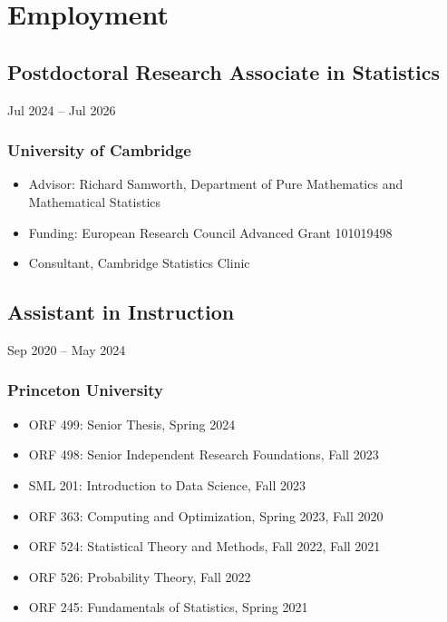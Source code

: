 \documentclass{wgu-cv}
\begin{document}
\maketitle

\section{Employment}

\subsection{Postdoctoral Research Associate in Statistics}
{Jul 2024 -- Jul 2026}
\subsubsection{University of Cambridge}

\begin{itemize}
  \item Advisor: Richard Samworth,
    Department of Pure Mathematics and Mathematical Statistics
  \item Funding: European Research Council Advanced Grant 101019498
  \item Consultant, Cambridge Statistics Clinic
\end{itemize}

\subsection{Assistant in Instruction}
{Sep 2020 -- May 2024}
\subsubsection{Princeton University}

\begin{itemize}

  \item
    ORF 499:
    Senior Thesis,
    Spring 2024

  \item
    ORF 498:
    Senior Independent Research Foundations,
    Fall 2023

  \item
    SML 201:
    Introduction to Data Science,
    Fall 2023

  \item
    ORF 363:
    Computing and Optimization,
    Spring 2023, Fall 2020

  \item
    ORF 524:
    Statistical Theory and Methods,
    Fall 2022, Fall 2021

  \item
    ORF 526:
    Probability Theory,
    Fall 2022

  \item
    ORF 245:
    Fundamentals of Statistics,
    Spring 2021

\end{itemize}
\end{document}
